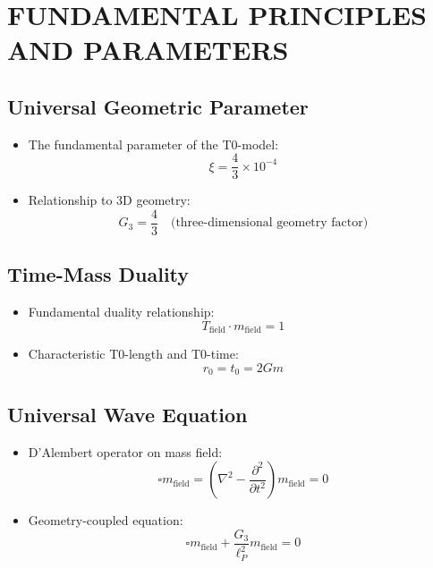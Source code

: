 \documentclass[12pt,a4paper]{article}
\begin{document}
	\newpage
	\tableofcontents
	\newpage
	
	\section{FUNDAMENTAL PRINCIPLES AND PARAMETERS}
	
	\subsection{Universal Geometric Parameter}
	\begin{itemize}
		\item The fundamental parameter of the T0-model:
		\begin{equation}
			\xi = \frac{4}{3} \times 10^{-4}
		\end{equation}
		
		\item Relationship to 3D geometry:
		\begin{equation}
			G_3 = \frac{4}{3} \quad \text{(three-dimensional geometry factor)}
		\end{equation}
	\end{itemize}
	
	\subsection{Time-Mass Duality}
	\begin{itemize}
		\item Fundamental duality relationship:
		\begin{equation}
			T_{\text{field}} \cdot m_{\text{field}} = 1
		\end{equation}
		
		\item Characteristic T0-length and T0-time:
		\begin{equation}
			r_0 = t_0 = 2Gm
		\end{equation}
	\end{itemize}
	
	\subsection{Universal Wave Equation}
	\begin{itemize}
		\item D'Alembert operator on mass field:
		\begin{equation}
			\square m_{\text{field}} = \left(\nabla^2 - \frac{\partial^2}{\partial t^2}\right) m_{\text{field}} = 0
		\end{equation}
		
		\item Geometry-coupled equation:
		\begin{equation}
			\square m_{\text{field}} + \frac{G_3}{\ell_P^2} m_{\text{field}} = 0
		\end{equation}
	\end{itemize}
	
\end{document}
